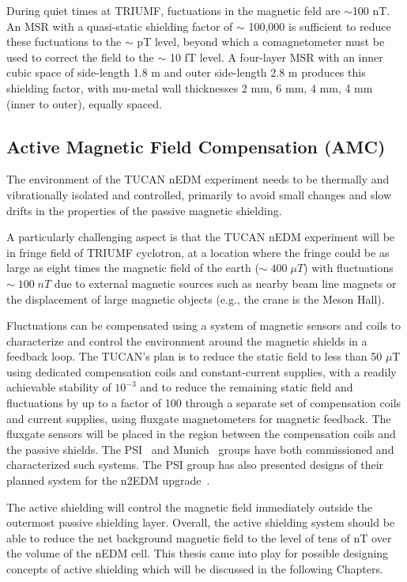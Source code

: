 During quiet times at TRIUMF, fuctuations in the magnetic feld are $\sim$100 nT. An MSR with a quasi-static shielding factor of $\sim$ 100,000 is sufficient to reduce these fuctuations to the $\sim$ pT level, beyond which a comagnetometer must be used to correct the field to the $\sim$ 10 fT level. A four-layer MSR with an inner cubic space of side-length 1.8 m and outer side-length 2.8 m produces this shielding factor, with mu-metal wall thicknesses 2 mm, 6 mm, 4 mm, 4 mm (inner to outer), equally spaced.


\subsection{Active Magnetic Field Compensation (AMC)}\label{sec:amc}

The environment of the TUCAN nEDM experiment needs to be thermally and vibrationally isolated and controlled, primarily to avoid small changes and slow drifts in the properties of the passive magnetic
shielding. 

A particularly challenging aspect is that the TUCAN nEDM experiment will be in fringe field of TRIUMF cyclotron, at a location where the fringe could be as large as eight times the magnetic field of the earth ($\sim\;400\;\mu T$) with  fluctuations $\sim\;100\;nT$ due to external magnetic sources such as nearby beam line magnets or the displacement of large magnetic objects (e.g.,
the crane is the Meson Hall).

Fluctuations can be compensated using a system of magnetic sensors and coils to characterize and control the environment around the magnetic shields in a feedback loop. The TUCAN's plan is to reduce the static field to less than 50 $\mu$T using dedicated compensation coils and constant-current supplies, with a readily achievable stability of $\mathrm{10^{-3}}$ and to reduce the remaining static field and fluctuations by up to a factor of 100 through a separate set of compensation coils and current supplies, using fluxgate magnetometers
for magnetic feedback. The fluxgate sensors will be placed in the region
between the compensation coils and the passive shields. The PSI~\cite{bea}
and Munich~\cite{lins} groups have both commissioned and characterized such systems. The PSI group has also presented designs of their planned system for the n2EDM upgrade~\cite{rawlik}.

The active shielding will control the magnetic field immediately outside the outermost passive shielding layer. Overall, the active shielding system should be able to reduce the net background magnetic field to the level of tens of nT over the volume of the nEDM cell. This thesis came into play for possible designing concepts of active shielding which will be discussed in the following Chapters.



